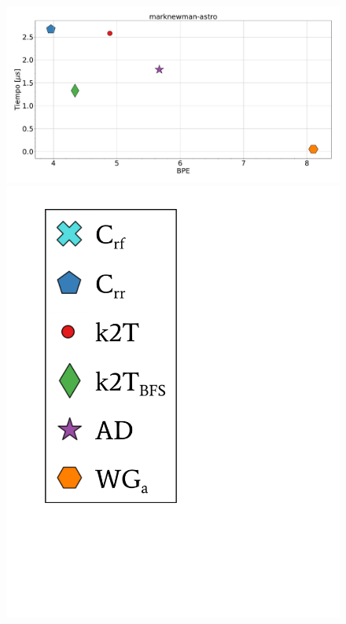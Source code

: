 \begin{figure}
    	\centering
    	\begin{minipage}{1\textwidth}
    			\centering
    			\begin{minipage}{0.8\textwidth}
    				\centering
    				\includegraphics[width=1\linewidth]{img/bpeTimes/aleatorio/marknewman-astro.pdf}
    			\end{minipage}
    			\begin{minipage}{0.15\textwidth}
    				\centering
    				\includegraphics[scale=.24, clip, trim=70 200 300 40]{img/bpeTimes/labelAle.pdf}
    			\end{minipage}
    			

\end{minipage}
\end{figure}
